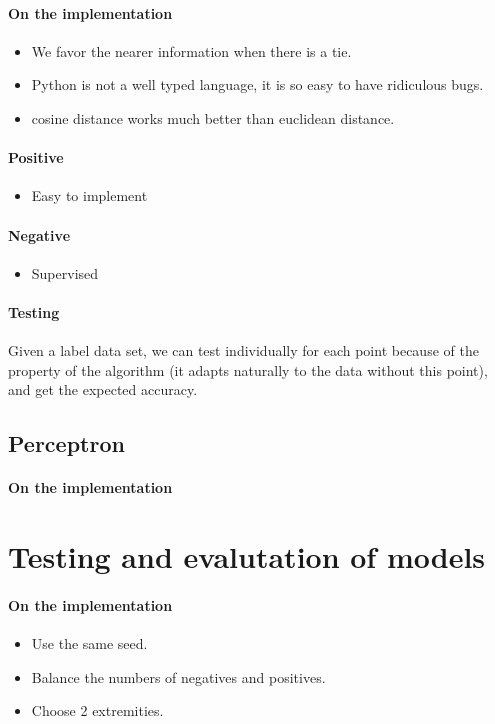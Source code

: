 \documentclass{article}
\begin{document}
\paragraph{On the implementation} \begin{itemize}
  \item We favor the nearer information when there is a tie.
  \item Python is not a well typed language, it is so easy to have
  ridiculous bugs.
  \item cosine distance works much better than euclidean distance.
\end{itemize}

\paragraph{Positive} \begin{itemize}
  \item Easy to implement
\end{itemize}

\paragraph{Negative} \begin{itemize}
  \item Supervised
\end{itemize}

\paragraph{Testing} Given a label data set, we can test individually
for each point because of the property of the algorithm (it adapts
naturally to the data without this point), and get the expected
accuracy.

\subsection{Perceptron}

\paragraph{On the implementation}

\section{Testing and evalutation of models}

\paragraph{On the implementation} \begin{itemize}
  \item Use the same seed.
  \item Balance the numbers of negatives and positives.
  \item Choose 2 extremities.
\end{itemize}

\printbibliography
\end{document}
